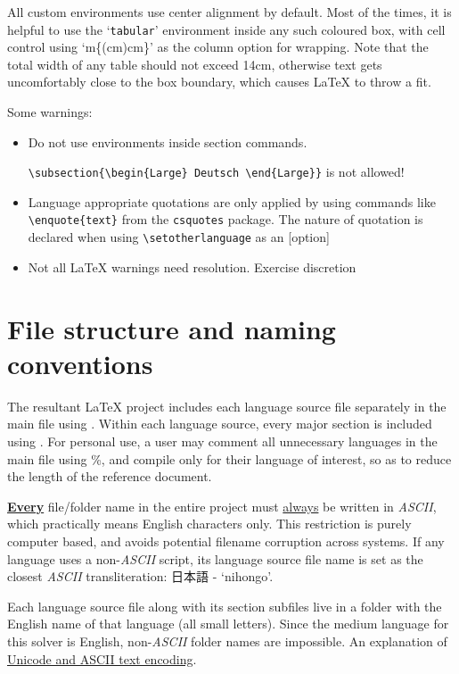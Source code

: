 \documentclass[12pt,twoside]{article}
\newcommand*{\bt}[1]{\textbf{#1}}
\newcommand*{\ut}[1]{\uline{#1}}
\newenvironment{example}{\def\FrameCommand{\colorbox{sampler}} \MakeFramed{\advance\hsize+\width}\begin{center}}{\end{center}\endMakeFramed}
\begin{document}
All custom environments use center alignment by default. Most of the times, it is helpful to use the `\texttt{tabular}' environment inside any such coloured box, with cell control using `m\{(cm)cm\}' as the column option for wrapping. Note that the total width of any table should not exceed 14cm, otherwise text gets uncomfortably close to the box boundary, which causes \LaTeX{} to throw a fit.

Some warnings:
\begin{itemize}
    \item Do not use environments  inside section commands. \begin{example} \verb|\subsection{\begin{Large} Deutsch \end{Large}}| is not allowed!\end{example}
    \item Language appropriate quotations are only applied by using commands like \verb|\enquote{text}| from the \texttt{csquotes} package. The nature of quotation is declared when using \verb|\setotherlanguage| as an [option]
    \item Not all \LaTeX{} warnings need resolution. Exercise discretion
\end{itemize}
\section{File structure and naming conventions}  \label{sec:enncfs}
The resultant \LaTeX{} project includes each language source file separately in the main file using  \verb||. Within each language source, every major section is included using \verb||. For personal use, a user may comment all unnecessary languages in the main file using \%, and compile only for their language of interest, so as to reduce the length of the reference document.

\bt{\ut{Every}} file/folder name in the entire project must  \ut{always} be written in \textit{ASCII}, which practically means English characters only. This restriction is purely computer based, and  avoids potential filename corruption across systems. If any language uses a non-\textit{ASCII} script, its  language source file name  is set as the closest \textit{ASCII} transliteration: \textjapanese{日本語} - `nihongo'. 

Each language source file along with its section subfiles live in a folder with the English name of that language (all small letters). Since the medium language for this solver is English, non-\textit{ASCII} folder names are  impossible. An explanation of \href{https://www.youtube.com/watch?v=vpSkBV5vydg}{Unicode and ASCII text encoding}.
\end{document}
